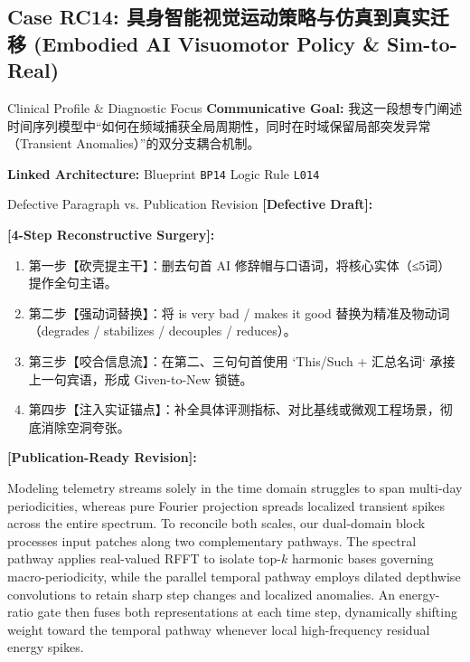 \subsection{Case RC14: 具身智能视觉运动策略与仿真到真实迁移 (Embodied AI Visuomotor Policy \& Sim-to-Real)}\label{case:RC14}
\begin{ConceptBox}{Clinical Profile \& Diagnostic Focus}
\textbf{Communicative Goal:} 我这一段想专门阐述时间序列模型中“如何在频域捕获全局周期性，同时在时域保留局部突发异常（Transient Anomalies）”的双分支耦合机制。\par
\textbf{Linked Architecture:} Blueprint \texttt{BP14} \enspace\textbar\enspace Logic Rule \texttt{L014}
\end{ConceptBox}
\begin{ExampleBox}{Defective Paragraph vs. Publication Revision}
\textbf{\color{TargetHighlight}[Defective Draft]:}\par
{}\par\vspace{6pt}
\textbf{\color{AcadForest}[4-Step Reconstructive Surgery]:}
\begin{enumerate}[label=\textbf{\color{AcadNavy}Step \arabic*:}, leftmargin=2em]
  \item 第一步【砍壳提主干】：删去句首 AI 修辞帽与口语词，将核心实体（≤5词）提作全句主语。
  \item 第二步【强动词替换】：将 is very bad / makes it good 替换为精准及物动词（degrades / stabilizes / decouples / reduces）。
  \item 第三步【咬合信息流】：在第二、三句句首使用 `This/Such + 汇总名词` 承接上一句宾语，形成 Given-to-New 锁链。
  \item 第四步【注入实证锚点】：补全具体评测指标、对比基线或微观工程场景，彻底消除空洞夸张。
\end{enumerate}\vspace{4pt}
\textbf{\color{AcadNavy}[Publication-Ready Revision]:}\par
Modeling telemetry streams solely in the time domain struggles to span multi-day periodicities, whereas pure Fourier projection spreads localized transient spikes across the entire spectrum. To reconcile both scales, our dual-domain block processes input patches along two complementary pathways. The spectral pathway applies real-valued RFFT to isolate top-$k$ harmonic bases governing macro-periodicity, while the parallel temporal pathway employs dilated depthwise convolutions to retain sharp step changes and localized anomalies. An energy-ratio gate then fuses both representations at each time step, dynamically shifting weight toward the temporal pathway whenever local high-frequency residual energy spikes.
\end{ExampleBox}
